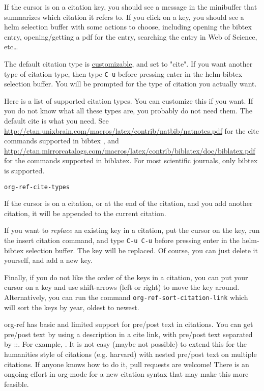 \documentclass[11pt]{article}
\begin{document}
If the cursor is on a citation key, you should see a message in the minibuffer that summarizes which citation it refers to. If you click on a key, you should see a helm selection buffer with some actions to choose, including opening the bibtex entry, opening/getting a pdf for the entry, searching the entry in Web of Science, etc\ldots{}

The default citation type is \hyperref[sec-3-1]{customizable}, and set to "cite". If you want another type of citation type, then type \verb~C-u~ before pressing enter in the helm-bibtex selection buffer. You will be prompted for the type of citation you actually want.

Here is a list of supported citation types. You can customize this if you want. If you do not know what all these types are, you probably do not need them. The default cite is what you need. See \url{http://ctan.unixbrain.com/macros/latex/contrib/natbib/natnotes.pdf}
 for the cite commands supported in bibtex , and \url{http://ctan.mirrorcatalogs.com/macros/latex/contrib/biblatex/doc/biblatex.pdf}
 for the commands supported in biblatex. For most scientific journals, only bibtex is supported. 

\begin{verbatim}
org-ref-cite-types
\end{verbatim}

If the cursor is on a citation, or at the end of the citation, and you add another citation, it will be appended to the current citation.

If you want to \emph{replace} an existing key in a citation, put the cursor on the key, run the insert citation command, and type \verb~C-u C-u~ before pressing enter in the helm-bibtex selection buffer. The key will be replaced. Of course, you can just delete it yourself, and add a new key.

Finally, if you do not like the order of the keys in a citation, you can put your cursor on a key and use shift-arrows (left or right) to move the key around. Alternatively, you can run the command \verb~org-ref-sort-citation-link~ which will sort the keys by year, oldest to newest.

org-ref has basic and limited support for pre/post text in citations. You can get pre/post text by using a description in a cite link, with pre/post text separated by ::. For example, \cite[See page 20][, for example]{Dominik201408}. It is not easy (maybe not possible) to extend this for the humanities style of citations (e.g. harvard) with nested pre/post text on multiple citations. If anyone knows how to do it, pull requests are welcome! There is an ongoing effort in org-mode for a new citation syntax that may make this more feasible.
\end{document}
